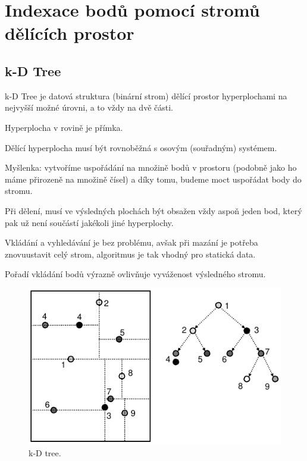 
\section{Indexace bodů pomocí stromů dělících prostor}

\subsection{k-D Tree}

\begin{compactitem}
    \item k-D Tree je datová struktura (binární strom) dělící prostor hyperplochami na nejvyšší možné úrovni, a to vždy na dvě části. \begin{compactitem}
        \item Hyperplocha v rovině je přímka.
        \item Dělící hyperplocha musí být rovnoběžná s osovým (souřadným) systémem.
    \end{compactitem}

    \item Myšlenka: vytvoříme uspořádání na množině bodů v prostoru (podobně jako ho máme přirozeně na množině čísel) a díky tomu, budeme moct uspořádat body do stromu.

    \item Při dělení, musí ve výsledných plochách být obsažen vždy aspoň jeden bod, který pak už není součástí jakékoli jiné hyperplochy.

    \item Vkládání a vyhledávání je bez problému, avšak při mazání je potřeba znovuustavit celý strom, algoritmus je tak vhodný pro statická data.

    \item Pořadí vkládání bodů výrazně ovlivňuje vyváženost výsledného stromu.
\end{compactitem}

\begin{figure}[H]
    \centering
    \includegraphics[width=0.75\linewidth]{kd_tree.pdf}
    \caption{k-D tree.}
\end{figure}

